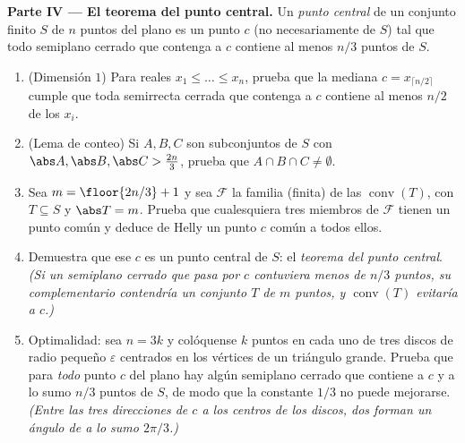 \begin{problem}
\medskip
\noindent\textbf{Parte IV --- El teorema del punto central.} Un
\emph{punto central} de un conjunto finito $S$ de $n$ puntos del
plano es un punto $c$ (no necesariamente de $S$) tal que todo
semiplano cerrado que contenga a $c$ contiene al menos $n/3$ puntos
de $S$.
\begin{enumerate}[resume]
  \item (Dimensión $1$) Para reales $x_1 \leq \dots \leq x_n$, prueba
        que la mediana $c = x_{\lceil n/2 \rceil}$ cumple que toda
        semirrecta cerrada que contenga a $c$ contiene al menos $n/2$
        de los $x_i$.
  \item (Lema de conteo) Si $A, B, C$ son subconjuntos de $S$ con
        $\abs A, \abs B, \abs C > \tfrac{2n}3$, prueba que $A \cap B
        \cap C \neq \emptyset$.
  \item Sea $m = \floor{2n/3} + 1$ y sea $\mathcal F$ la familia
        (finita) de las  $\operatorname{conv}(T)$,
        con $T \subseteq S$ y $\abs T = m$. Prueba que cualesquiera
        tres miembros de $\mathcal F$ tienen un punto común y deduce
        de Helly un punto $c$ común a todos ellos.
  \item Demuestra que ese $c$ es un punto central de $S$: el
        \emph{teorema del punto central}. \emph{(Si un semiplano
        cerrado que pasa por $c$ contuviera menos de $n/3$ puntos, su
        complementario  contendría un conjunto $T$ de $m$
        puntos, y $\operatorname{conv}(T)$ evitaría a $c$.)}
  \item Optimalidad: sea $n = 3k$ y colóquense $k$ puntos en cada uno
        de tres discos de radio pequeño $\varepsilon$ centrados en
        los vértices de un triángulo grande. Prueba que para
        \emph{todo} punto $c$ del plano hay algún semiplano cerrado
        que contiene a $c$ y a lo sumo $n/3$ puntos de $S$, de modo
        que la constante $1/3$ no puede mejorarse. \emph{(Entre las
        tres direcciones de $c$ a los centros de los discos, dos
        forman un ángulo de a lo sumo $2\pi/3$.)}
\end{enumerate}


\end{problem}
